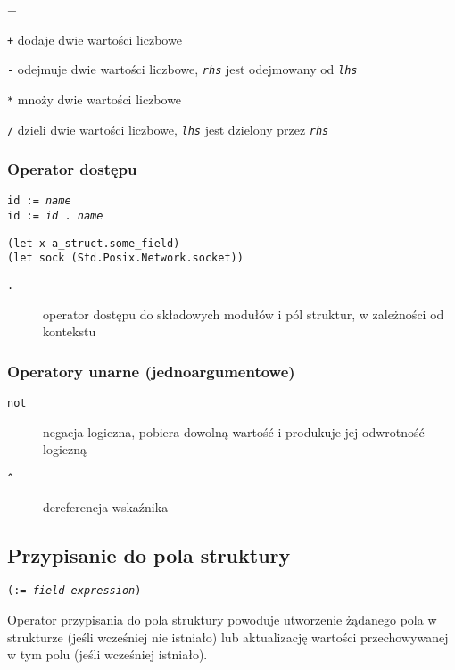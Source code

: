 \begin{labeling}{+}
    \item[\texttt{+}] dodaje dwie wartości liczbowe
    \item[\texttt{-}] odejmuje dwie wartości liczbowe, \emph{\texttt{rhs}} jest odejmowany od
        \emph{\texttt{lhs}}
    \item[\texttt{*}] mnoży dwie wartości liczbowe
    \item[\texttt{/}] dzieli dwie wartości liczbowe, \emph{\texttt{lhs}} jest dzielony przez
        \emph{\texttt{rhs}}
\end{labeling}

\subsubsection{Operator dostępu}

\texttt{id := \emph{name}} \\
\texttt{id := \emph{id} . \emph{name}}

\begin{lstlisting}
(let x a_struct.some_field)
(let sock (Std.Posix.Network.socket))
\end{lstlisting}

\begin{description}
    \item[\texttt{.}] operator dostępu do składowych modułów i pól struktur, w zależności od kontekstu
\end{description}

\subsubsection{Operatory unarne (jednoargumentowe)}

\begin{description}
    \item[\texttt{not}] negacja logiczna, pobiera dowolną wartość i produkuje jej odwrotność logiczną
    \item[\texttt{\^}] dereferencja wskaźnika
\end{description}

\subsection{Przypisanie do pola struktury}

\texttt{(:= \emph{field} \emph{expression})}
\vspace{1em}

Operator przypisania do pola struktury powoduje utworzenie żądanego pola w strukturze (jeśli wcześniej nie
istniało) lub aktualizację wartości przechowywanej w tym polu (jeśli wcześniej istniało).

